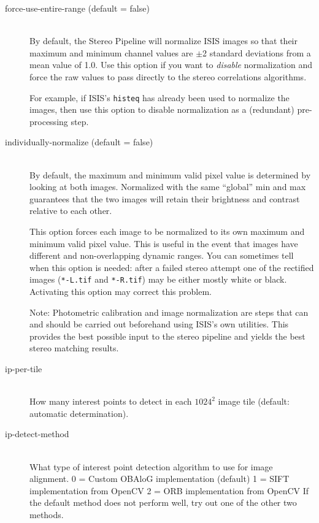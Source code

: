 \begin{description}
\item[force-use-entire-range \textnormal (default = false)] \hfill \\
  By default, the Stereo Pipeline will normalize ISIS images so that
  their maximum and minimum channel values are $\pm$2 standard
  deviations from a mean value of 1.0.  Use this option if you want to
  {\em disable} normalization and force the raw
  values to pass directly to the stereo correlations algorithms.

  For example, if ISIS's \texttt{histeq} has already been used to
  normalize the images, then use this option to disable normalization
  as a (redundant) pre-processing step.


\item[individually-normalize \textnormal (default = false)] \hfill \\
  By default, the maximum and minimum valid pixel value is determined
  by looking at both images.  Normalized with the same ``global'' min
  and max guarantees that the two images will retain their brightness
  and contrast relative to each other.

  This option forces each image to be normalized to its own maximum
  and minimum valid pixel value. This is useful in the event that
  images have different and non-overlapping dynamic ranges. You can
  sometimes tell when this option is needed: after a failed stereo
  attempt one of the rectified images (\texttt{*-L.tif} and
  \texttt{*-R.tif}) may be either mostly white or black.  Activating
  this option may correct this problem.

  Note: Photometric calibration and image normalization are steps that
  can and should be carried out beforehand using ISIS's own utilities.
  This provides the best possible input to the stereo pipeline and
  yields the best stereo matching results.

\item[ip-per-tile]  \hfill \\
How many interest points to detect in each $1024^2$ image tile (default: automatic
determination).

\item[ip-detect-method]  \hfill \\
What type of interest point detection algorithm to use for image alignment.
0 = Custom OBAloG implementation (default)
1 = SIFT implementation from OpenCV
2 = ORB implementation from OpenCV
If the default method does not perform well, try out one of the other two methods.


\end{description}
